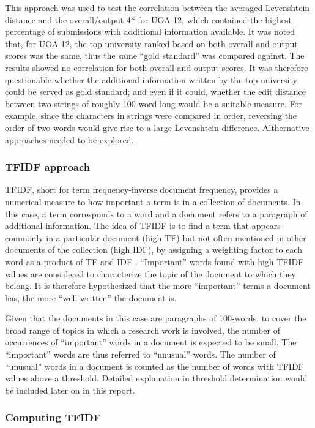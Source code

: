 \documentclass[a4paper, 11pt]{article}
\begin{document}
This approach was used to test the correlation  between the averaged Levenshtein distance and the overall/output 4* for UOA 12, which contained the highest percentage of submissions with additional information available. It was noted that, for UOA 12, the top university ranked based on both overall and output scores was the same, thus the same ``gold standard'' was compared against. The results showed no correlation for both overall and output scores. It was therefore questionable whether the additional information written by the top university could be served as gold standard; and even if it could, whether the edit distance between two strings of roughly 100-word long would be a suitable measure. For example, since the characters in strings were compared in order, reversing the order of two words would give rise to a large Levenshtein difference. Althernative approaches needed to be explored.

\subsubsection{TFIDF approach}

TFIDF, short for term frequency-inverse document frequency, provides a numerical measure to how important a term is in a collection of documents. In this case, a term corresponds to a word and a document refers to a paragraph of additional information. The idea of TFIDF is to find a term that appears commonly in a particular document (high TF) but not often mentioned in other documents of the collection (high IDF), by assigning a weighting factor to each word as a product of TF and IDF \citep{DataMining}. ``Important'' words found with high TFIDF values are considered to characterize the topic of the document to which they belong. It is therefore hypothesized that the more ``important'' terms a document has, the more ``well-written'' the document is. 

Given that the documents in this case are paragraphs of 100-words, to cover the broad range of topics in which a research work is involved, the number of occurrences of ``important'' words in a document is expected to be small. The ``important'' words are thus referred to ``unusual'' words. The number of ``unusual'' words in a document is counted as the number of words with TFIDF values above a threshold. Detailed explanation in threshold determination would be included later on in this report.

\subsubsection{Computing TFIDF}
\end{document}
